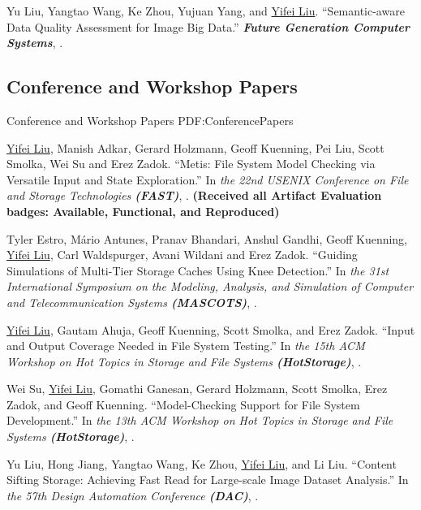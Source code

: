 \documentclass[a4paper,10pt,oneside]{article}
\begin{document}
\begin{body}
\NumberedItem{[3]}
Yu Liu, Yangtao Wang, Ke Zhou, Yujuan Yang, and \underline{Yifei Liu}.
``Semantic-aware Data Quality Assessment for Image Big Data.'' 
\textit{\textbf{Future Generation Computer Systems}},
.

\subsection
{Conference and Workshop Papers}
{Conference and Workshop Papers}
{PDF:ConferencePapers}

\NumberedItem{[1]}
\underline{Yifei Liu}, Manish Adkar, Gerard Holzmann, Geoff Kuenning, Pei Liu, Scott Smolka, Wei Su and Erez Zadok.
``Metis: File System Model Checking via Versatile Input and State Exploration.''
In \textit{the 22nd USENIX Conference on File and Storage Technologies
\textbf{(FAST)}}, %
. \textbf{(Received all Artifact Evaluation badges: Available, Functional, and Reproduced)}

\NumberedItem{[2]}
Tyler Estro, Mário Antunes, Pranav Bhandari, Anshul Gandhi, Geoff Kuenning, \underline{Yifei Liu}, Carl Waldspurger, Avani Wildani and Erez Zadok.
``Guiding Simulations of Multi-Tier Storage Caches Using Knee Detection.''
In \textit{the 31st International Symposium on the Modeling, Analysis, and Simulation of Computer and Telecommunication Systems \textbf{(MASCOTS)}}, %
. 

\Gap

\NumberedItem{[3]}
\underline{Yifei Liu}, Gautam Ahuja, Geoff Kuenning, Scott Smolka, and Erez Zadok.
``Input and Output Coverage Needed in File System Testing.''
In \textit{the 15th ACM Workshop on Hot Topics in Storage and File Systems \textbf{(HotStorage)}}, %
.


\NumberedItem{[4]}
Wei Su, \underline{Yifei Liu}, Gomathi Ganesan, Gerard Holzmann, Scott Smolka, Erez Zadok, and Geoff Kuenning.
``Model-Checking Support for File System Development.''
In \textit{the 13th ACM Workshop on Hot Topics in Storage and File Systems \textbf{(HotStorage)}}, %
.


\NumberedItem{[5]}
Yu Liu, Hong Jiang, Yangtao Wang, Ke Zhou, \underline{Yifei Liu}, and Li Liu.
``Content Sifting Storage: Achieving Fast Read for Large-scale Image Dataset Analysis.''
In \textit{the 57th Design Automation Conference \textbf{(DAC)}}, %
.


\end{body}
\end{document}
